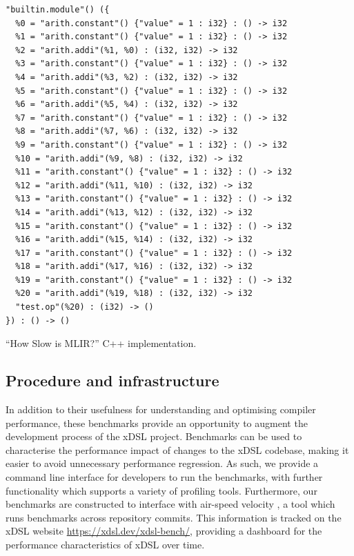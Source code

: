 \begin{code}
   \centering
    \begin{verbatim}
"builtin.module"() ({
  %0 = "arith.constant"() {"value" = 1 : i32} : () -> i32
  %1 = "arith.constant"() {"value" = 1 : i32} : () -> i32
  %2 = "arith.addi"(%1, %0) : (i32, i32) -> i32
  %3 = "arith.constant"() {"value" = 1 : i32} : () -> i32
  %4 = "arith.addi"(%3, %2) : (i32, i32) -> i32
  %5 = "arith.constant"() {"value" = 1 : i32} : () -> i32
  %6 = "arith.addi"(%5, %4) : (i32, i32) -> i32
  %7 = "arith.constant"() {"value" = 1 : i32} : () -> i32
  %8 = "arith.addi"(%7, %6) : (i32, i32) -> i32
  %9 = "arith.constant"() {"value" = 1 : i32} : () -> i32
  %10 = "arith.addi"(%9, %8) : (i32, i32) -> i32
  %11 = "arith.constant"() {"value" = 1 : i32} : () -> i32
  %12 = "arith.addi"(%11, %10) : (i32, i32) -> i32
  %13 = "arith.constant"() {"value" = 1 : i32} : () -> i32
  %14 = "arith.addi"(%13, %12) : (i32, i32) -> i32
  %15 = "arith.constant"() {"value" = 1 : i32} : () -> i32
  %16 = "arith.addi"(%15, %14) : (i32, i32) -> i32
  %17 = "arith.constant"() {"value" = 1 : i32} : () -> i32
  %18 = "arith.addi"(%17, %16) : (i32, i32) -> i32
  %19 = "arith.constant"() {"value" = 1 : i32} : () -> i32
  %20 = "arith.addi"(%19, %18) : (i32, i32) -> i32
  "test.op"(%20) : (i32) -> ()
}) : () -> ()
    \end{verbatim}
    \caption{``How Slow is MLIR?'' C++ implementation.}
    \label{listing:constant-folding-example}
\end{code}



\subsection{Procedure and infrastructure}
\label{ssec:procedure-infrastructure}



In addition to their usefulness for understanding and optimising compiler performance, these benchmarks provide an opportunity to augment the development process of the xDSL project.
Benchmarks can be used to characterise the performance impact of changes to the xDSL codebase, making it easier to avoid unnecessary performance regression.
As such, we provide a command line interface for developers to run the benchmarks, with further functionality which supports a variety of profiling tools.
Furthermore, our benchmarks are constructed to interface with air-speed velocity \cite{michaeldroettboomAirspeedvelocityAsv2025}, a tool which runs benchmarks across repository commits. This information is tracked on the xDSL website \url{https://xdsl.dev/xdsl-bench/}, providing a dashboard for the performance characteristics of xDSL over time.


















